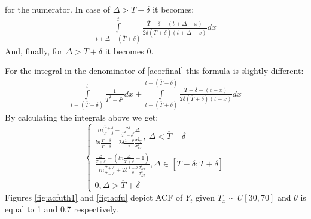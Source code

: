 \documentclass[12pt]{article}
\begin{document}
for the numerator. In case of $\Delta>\overline{T}-\delta$ it becomes:
\begin{equation*}
\begin{gathered}
\int\limits^{t}_{t+\Delta-(\overline{T}+\delta)}\frac{\overline{T}+\delta-(t+\Delta-x)}{2\delta(\overline{T}+\delta)(t+\Delta-x)}dx
\end{gathered}
\end{equation*}
And, finally, for $\Delta>\overline{T}+\delta$ it becomes 0.

For the integral in the denominator of \eqref{acorfinal} this formula is slightly different:
\begin{equation*}
\begin{gathered}
\int\limits^t_{t-(\overline{T}-\delta)}\frac{1}{\overline{T}^2-\delta^2}dx+\int\limits^{t-(\overline{T}-\delta)}_{t-(\overline{T}+\delta)}\frac{\overline{T}+\delta-(t-x)}{2\delta(\overline{T}+\delta)(t-x)}dx
\end{gathered}
\end{equation*}
By calculating the integrals above we get:
\begin{equation}\label{acorunif}
\begin{cases}
\frac{ln\frac{\overline{T}+\delta}{\overline{T}-\delta}-\frac{2\delta}{\overline{T}^2-\delta^2}\Delta}{ln\frac{\overline{T}+\delta}{\overline{T}-\delta}+2\delta\frac{1-\theta}{\theta}\frac{\sigma^2_{NT}}{\sigma^2_{LT}}},\ \Delta<\overline{T}-\delta\\
\frac{\frac{\Delta}{\overline{T}+\delta}-(ln\frac{\Delta}{\overline{T}+\delta}+1)}{ln\frac{\overline{T}+\delta}{\overline{T}-\delta}+2\delta\frac{1-\theta}{\theta}\frac{\sigma^2_{NT}}{\sigma^2_{LT}}}, \Delta\in[\overline{T}-\delta;\overline{T}+\delta]\\
0, \Delta>\overline{T}+\delta
\end{cases}
\end{equation}
Figures \ref{fig:acfuth1} and \ref{fig:acfu} depict ACF of $Y_t$ given $T_x\sim U[30,70]$ and $\theta$ is equal to 1 and 0.7 respectively.
\end{document}
